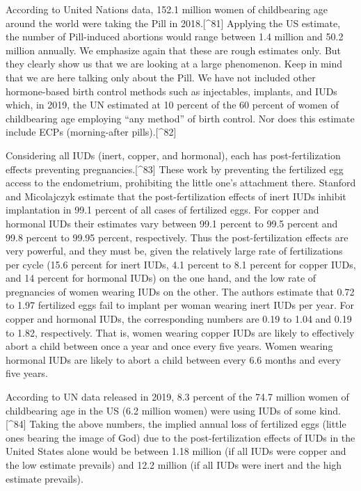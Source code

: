 \documentclass[
]{book}
\begin{document}
According to United Nations data, 152.1 million women of childbearing age around the world were taking the Pill in 2018.{[}\^{}81{]} Applying the US estimate, the number of Pill-induced abortions would range between 1.4 million and 50.2 million annually. We emphasize again that these are rough estimates only. But they clearly show us that we are looking at a large phenomenon. Keep in mind that we are here talking only about the Pill. We have not included other hormone-based birth control methods such as injectables, implants, and IUDs which, in 2019, the UN estimated at 10 percent of the 60 percent of women of childbearing age employing ``any method'' of birth control. Nor does this estimate include ECPs (morning-after pills).{[}\^{}82{]}

Considering all IUDs (inert, copper, and hormonal), each has post-fertilization effects preventing pregnancies.{[}\^{}83{]} These work by preventing the fertilized egg access to the endometrium, prohibiting the little one's attachment there. Stanford and Micolajczyk estimate that the post-fertilization effects of inert IUDs inhibit implantation in 99.1 percent of all cases of fertilized eggs. For copper and hormonal IUDs their estimates vary between 99.1 percent to 99.5 percent and 99.8 percent to 99.95 percent, respectively. Thus the post-fertilization effects are very powerful, and they must be, given the relatively large rate of fertilizations per cycle (15.6 percent for inert IUDs, 4.1 percent to 8.1 percent for copper IUDs, and 14 percent for hormonal IUDs) on the one hand, and the low rate of pregnancies of women wearing IUDs on the other. The authors estimate that 0.72 to 1.97 fertilized eggs fail to implant per woman wearing inert IUDs per year. For copper and hormonal IUDs, the corresponding numbers are 0.19 to 1.04 and 0.19 to 1.82, respectively. That is, women wearing copper IUDs are likely to effectively abort a child between once a year and once every five years. Women wearing hormonal IUDs are likely to abort a child between every 6.6 months and every five years.

According to UN data released in 2019, 8.3 percent of the 74.7 million women of childbearing age in the US (6.2 million women) were using IUDs of some kind.{[}\^{}84{]} Taking the above numbers, the implied annual loss of fertilized eggs (little ones bearing the image of God) due to the post-fertilization effects of IUDs in the United States alone would be between 1.18 million (if all IUDs were copper and the low estimate prevails) and 12.2 million (if all IUDs were inert and the high estimate prevails).
\end{document}

